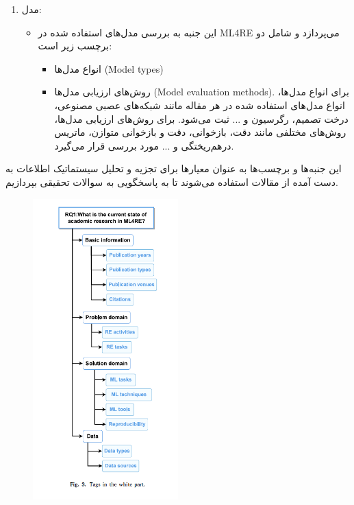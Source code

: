 \documentclass[a4paper,10pt]{article}
\begin{document}
\begin{enumerate}
                        \item مدل:
                        \begin{itemize}
                            \item این جنبه به بررسی مدل‌های استفاده شده در ML4RE می‌پردازد و شامل دو برچسب زیر است:
                            \begin{itemize}
                                \item انواع مدل‌ها (Model types)
                                \item روش‌های ارزیابی مدل‌ها (Model evaluation methods). برای انواع مدل‌ها، انواع مدل‌های استفاده شده در هر مقاله مانند شبکه‌های عصبی مصنوعی، درخت تصمیم، رگرسیون و ... ثبت می‌شود. برای روش‌های ارزیابی مدل‌ها، روش‌های مختلفی مانند دقت، بازخوانی، دقت و بازخوانی متوازن، ماتریس درهم‌ریختگی و ... مورد بررسی قرار می‌گیرد.
                            \end{itemize}
                        \end{itemize}
                    \end{enumerate}
                    

                    این جنبه‌ها و برچسب‌ها به عنوان معیارها برای تجزیه و تحلیل سیستماتیک اطلاعات به دست آمده از مقالات استفاده می‌شوند تا به پاسخگویی به سوالات تحقیقی بپردازیم.


                    \begin{figure}
                        \centering
                        \includegraphics[width=0.5\textwidth]{Image/fig-3.jpg}
                    \end{figure}
\end{document}
